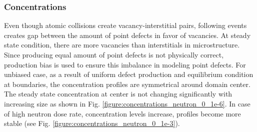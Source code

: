 \documentclass[a4paper]{article}
\begin{document}
  \subsubsection{Concentrations} \hspace{10pt}
  Even though atomic collisions create vacancy-interstitial pairs, following events creates gap between the amount of point defects in favor of vacancies. At steady state condition, there are more vacancies than interstitials in microstructure. Since producing equal amount of point defects is not physically correct, production bias is used to ensure this imbalance in modeling point defects. For unbiased case, as a result of uniform defect production and equilibrium condition at boundaries, the concentration profiles are symmetrical around domain center. The steady state concentration at center is not changing significantly with increasing size as shown in Fig. \ref{figure:concentrations_neutron_0_1e-6}. In case of high neutron dose rate, concentration levels increase, profiles become more stable (see Fig. \ref{figure:concentrations_neutron_0_1e-3}).\\
\end{document}
